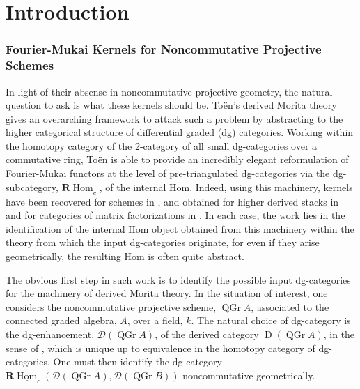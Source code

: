 \chapter*{Introduction}
\subsection*{Fourier-Mukai Kernels for Noncommutative Projective Schemes}

In light of their absense in noncommutative projective geometry, the natural question to ask is what these kernels should be.
To\"en's derived Morita theory \parencite{Toen07} gives an overarching framework to attack such a problem by abstracting to the higher categorical structure of differential graded (dg) categories.
Working within the homotopy category of the 2-category of all small dg-categories over a commutative ring, To\"en is able to provide an incredibly elegant reformulation of Fourier-Mukai functors at the level of pre-triangulated dg-categories via the dg-subcategory, \(\mathbf{R}\underline{\operatorname{Hom}}_c\), of the internal Hom.
Indeed, using this machinery, kernels have been recovered for schemes in \parencite{Toen07}, and obtained for higher derived stacks in \parencite{BFN10} and for categories of matrix factorizations in \parencite{Dyckerhoff11,PV12,BFK14}.
In each case, the work lies in the identification of the internal Hom object obtained from this machinery within the theory from which the input dg-categories originate, for even if they arise geometrically, the resulting Hom is often quite abstract.

The obvious first step in such work is to identify the possible input dg-categories for the machinery of derived Morita theory.
In the situation of interest, one considers the noncommutative projective scheme, \(\operatorname{QGr} A\), associated to the connected graded algebra, \(A\), over a field, \(k\). 
The natural choice of dg-category is the dg-enhancement, \(\mathcal{D}(\operatorname{QGr} A)\), of the derived category \(\operatorname{D}(\operatorname{QGr} A)\), in the sense of \parencite{Lunts-Orlov}, which is unique up to equivalence in the homotopy category of dg-categories.
One must then identify the dg-category \(\mathbf{R}\underline{\operatorname{Hom}}_c(\mathcal{D}(\operatorname{QGr} A), \mathcal{D}(\operatorname{QGr} B))\) noncommutative geometrically.

